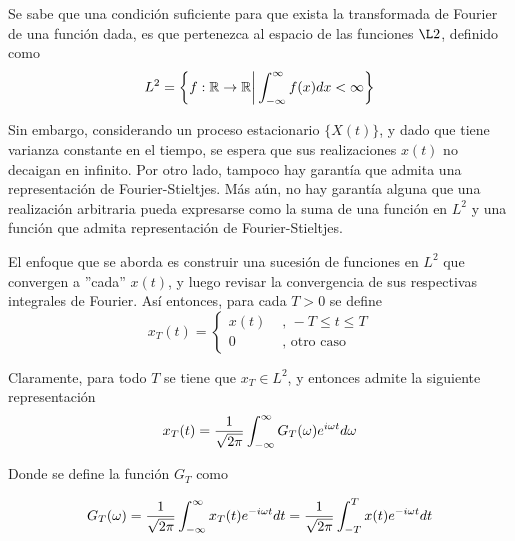Se sabe que una condici\'on suficiente para que exista la transformada de Fourier de una funci\'on
dada, es que pertenezca al espacio de las funciones $\L2$, definido como
\begin{equation*}
L^2 = \left\{ f: \mathbb{R} \rightarrow \mathbb{R} {\biggr\rvert} \int_{-\infty}^{\infty} f(x) dx < \infty \right\}
\end{equation*}

Sin embargo, considerando un proceso estacionario $\{ X(t) \}$, y dado que tiene varianza constante 
en el tiempo, se 
espera que sus realizaciones $x(t)$ no decaigan en infinito. Por otro lado, tampoco hay garant\'ia
que admita una representaci\'on de Fourier-Stieltjes. M\'as a\'un, no hay garant\'ia alguna que
una realizaci\'on arbitraria pueda expresarse como la suma de una funci\'on en $L^2$ y una
funci\'on que admita representaci\'on de Fourier-Stieltjes.

El enfoque que se aborda es construir una sucesi\'on de funciones 
en $L^{2}$
que convergen a ''cada''
$x(t)$, y luego revisar la convergencia de sus respectivas integrales de Fourier.
As\'i entonces, para cada $T>0$ se define
\begin{equation}
x_T(t) = 
\begin{cases}
x(t) & \text{ , } -T\leq t \leq T
\\
0 & \text{ , otro caso}
\end{cases}
\end{equation}

Claramente, para todo $T$ se tiene que $x_T \in L^2$, y entonces admite la siguiente 
representaci\'on
\begin{equation}
x_T (t) = \frac{1}{\sqrt{2 \pi}} \int_{-\infty}^{\infty} G_T(\omega) e^{i \omega t} d\omega
\end{equation}

Donde se define la funci\'on $G_T$ como

\begin{equation}
G_T (\omega) = \frac{1}{\sqrt{2 \pi}} \int_{-\infty}^{\infty} x_T(t) e^{-i \omega t} dt
= \frac{1}{\sqrt{2 \pi}} \int_{-T}^{T} x(t) e^{-i \omega t} dt
\end{equation}

